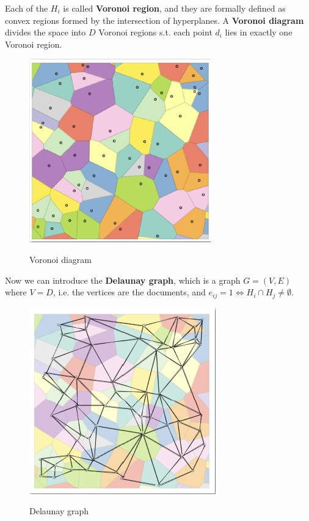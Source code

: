 Each of the $H_i$ is called \textbf{Voronoi region}, and they are formally defined as convex regions formed by the intersection of hyperplanes. A \textbf{Voronoi diagram} divides the space into $D$ Voronoi regions s.t. each point $d_i$ lies in exactly one Voronoi region. 

\begin{figure}[h!]
		\centering
		\includegraphics[scale = 1.8]{img/graph_1.jpg}
        \label{graph1}
        \caption{Voronoi diagram}
\end{figure}

Now we can introduce the \textbf{Delaunay graph}, which is a graph $G = (V,E)$ where $V = D$, i.e. the vertices are the documents, and $e_{ij} = 1 \iff H_i \cap H_j \neq \emptyset$.

\begin{figure}[h!]
		\centering
		\includegraphics[scale = 1.8]{img/graph_2.jpg}
        \label{graph2}
        \caption{Delaunay graph}
\end{figure}

